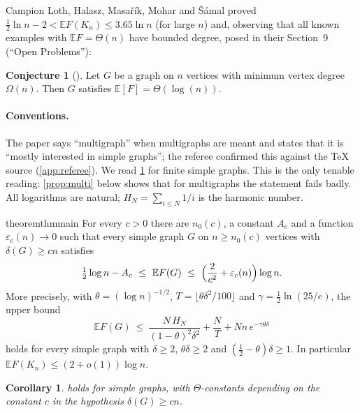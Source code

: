 \documentclass[11pt,a4paper]{article}
\theoremstyle{plain}
\newtheorem{corollary}[theorem]{Corollary}
\theoremstyle{definition}
\newtheorem{conjecture}[theorem]{Conjecture}
\theoremstyle{remark}
\newcommand{\E}{\mathbb E}
\begin{document}
Campion Loth, Halasz, Masařík, Mohar and Šámal \cite{CHMMS} proved $\tfrac12\ln n-2<\E F(K_n)\le3.65\ln n$ (for large $n$) and, observing that all known examples with $\E F=\Theta(n)$ have bounded degree, posed in their Section~9 (``Open Problems''):

\begin{conjecture}[{\cite[Conjecture~9.3]{CHMMS}}]\label{conj:93}
Let $G$ be a graph on $n$ vertices with minimum vertex degree $\Omega(n)$. Then $G$ satisfies $\E[F]=\Theta(\log(n))$.
\end{conjecture}

\paragraph{Conventions.}
The paper \cite{CHMMS} says ``multigraph'' when multigraphs are meant and states that it is ``mostly interested in simple graphs''; the referee confirmed this against the \TeX{} source (\cref{app:referee}). We read \cref{conj:93} for finite simple graphs. This is the only tenable reading: \cref{prop:multi} below shows that for multigraphs the statement fails badly. All logarithms are natural; $H_N=\sum_{i\le N}1/i$ is the harmonic number.

\begin{restatable}{theorem}{thmmain}\label{thm:main}
For every $c>0$ there are $n_0(c)$, a constant $A_c$ and a function $\varepsilon_c(n)\to0$ such that every simple graph $G$ on $n\ge n_0(c)$ vertices with $\delta(G)\ge cn$ satisfies
\[
 \tfrac12\log n-A_c\ \le\ \E F(G)\ \le\ \Bigl(\frac2{c^2}+\varepsilon_c(n)\Bigr)\log n .
\]
More precisely, with $\theta=(\log n)^{-1/2}$, $T=\lfloor\theta\delta^2/100\rfloor$ and $\gamma=\tfrac12\ln(25/e)$, the upper bound
\begin{equation}\label{eq:precise}
 \E F(G)\ \le\ \frac{N\,H_N}{(1-\theta)^2\delta^2}+\frac NT+Nn\,e^{-\gamma\theta\delta}
\end{equation}
holds for every simple graph with $\delta\ge2$, $\theta\delta\ge2$ and $(\tfrac12-\theta)\delta\ge1$. In particular $\E F(K_n)\le(2+o(1))\log n$.
\end{restatable}

\begin{corollary}
 holds for simple graphs, with $\Theta$-constants depending on the constant $c$ in the hypothesis $\delta(G)\ge cn$.
\end{corollary}
\end{document}
